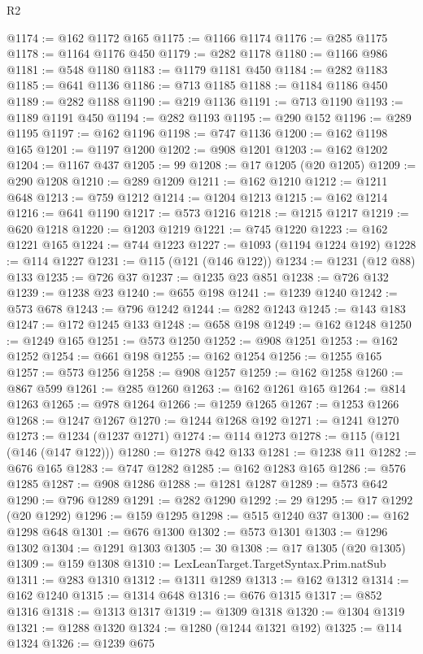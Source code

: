 \begin{lexlean}{R2}
\begin{coremodule}
@1174 := @162 @1172 @165
@1175 := @1166 @1174
@1176 := @285 @1175
@1178 := @1164 @1176 @450
@1179 := @282 @1178
@1180 := @1166 @986
@1181 := @548 @1180
@1183 := @1179 @1181 @450
@1184 := @282 @1183
@1185 := @641 @1136
@1186 := @713 @1185
@1188 := @1184 @1186 @450
@1189 := @282 @1188
@1190 := @219 @1136
@1191 := @713 @1190
@1193 := @1189 @1191 @450
@1194 := @282 @1193
@1195 := @290 @152
@1196 := @289 @1195
@1197 := @162 @1196
@1198 := @747 @1136
@1200 := @162 @1198 @165
@1201 := @1197 @1200
@1202 := @908 @1201
@1203 := @162 @1202
@1204 := @1167 @437
@1205 := 99
@1208 := @17 @1205 (@20 @1205)
@1209 := @290 @1208
@1210 := @289 @1209
@1211 := @162 @1210
@1212 := @1211 @648
@1213 := @759 @1212
@1214 := @1204 @1213
@1215 := @162 @1214
@1216 := @641 @1190
@1217 := @573 @1216
@1218 := @1215 @1217
@1219 := @620 @1218
@1220 := @1203 @1219
@1221 := @745 @1220
@1223 := @162 @1221 @165
@1224 := @744 @1223
@1227 := @1093 (@1194 @1224 @192)
@1228 := @114 @1227
@1231 := @115 (@121 (@146 @122))
@1234 := @1231 (@12 @88) @133
@1235 := @726 @37
@1237 := @1235 @23 @851
@1238 := @726 @132
@1239 := @1238 @23
@1240 := @655 @198
@1241 := @1239 @1240
@1242 := @573 @678
@1243 := @796 @1242
@1244 := @282 @1243
@1245 := @143 @183
@1247 := @172 @1245 @133
@1248 := @658 @198
@1249 := @162 @1248
@1250 := @1249 @165
@1251 := @573 @1250
@1252 := @908 @1251
@1253 := @162 @1252
@1254 := @661 @198
@1255 := @162 @1254
@1256 := @1255 @165
@1257 := @573 @1256
@1258 := @908 @1257
@1259 := @162 @1258
@1260 := @867 @599
@1261 := @285 @1260
@1263 := @162 @1261 @165
@1264 := @814 @1263
@1265 := @978 @1264
@1266 := @1259 @1265
@1267 := @1253 @1266
@1268 := @1247 @1267
@1270 := @1244 @1268 @192
@1271 := @1241 @1270
@1273 := @1234 (@1237 @1271)
@1274 := @114 @1273
@1278 := @115 (@121 (@146 (@147 @122)))
@1280 := @1278 @42 @133
@1281 := @1238 @11
@1282 := @676 @165
@1283 := @747 @1282
@1285 := @162 @1283 @165
@1286 := @576 @1285
@1287 := @908 @1286
@1288 := @1281 @1287
@1289 := @573 @642
@1290 := @796 @1289
@1291 := @282 @1290
@1292 := 29
@1295 := @17 @1292 (@20 @1292)
@1296 := @159 @1295
@1298 := @515 @1240 @37
@1300 := @162 @1298 @648
@1301 := @676 @1300
@1302 := @573 @1301
@1303 := @1296 @1302
@1304 := @1291 @1303
@1305 := 30
@1308 := @17 @1305 (@20 @1305)
@1309 := @159 @1308
@1310 := LexLeanTarget.TargetSyntax.Prim.natSub
@1311 := @283 @1310
@1312 := @1311 @1289
@1313 := @162 @1312
@1314 := @162 @1240
@1315 := @1314 @648
@1316 := @676 @1315
@1317 := @852 @1316
@1318 := @1313 @1317
@1319 := @1309 @1318
@1320 := @1304 @1319
@1321 := @1288 @1320
@1324 := @1280 (@1244 @1321 @192)
@1325 := @114 @1324
@1326 := @1239 @675

\end{coremodule}
\end{lexlean}
